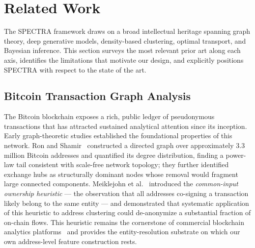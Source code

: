 
\section{Related Work}
\label{sec:related_work}

The SPECTRA framework draws on a broad intellectual heritage spanning graph
theory, deep generative models, density-based clustering, optimal transport,
and Bayesian inference.  This section surveys the most relevant prior art along
each axis, identifies the limitations that motivate our design, and explicitly
positions SPECTRA with respect to the state of the art.

\subsection{Bitcoin Transaction Graph Analysis}
\label{subsec:bitcoin_graph}

The Bitcoin blockchain exposes a rich, public ledger of pseudonymous
transactions that has attracted sustained analytical attention since its
inception.  Early graph-theoretic studies established the foundational
properties of this network.  Ron and Shamir~\cite{Ron2013} constructed a
directed graph over approximately 3.3 million Bitcoin addresses and quantified
its degree distribution, finding a power-law tail consistent with scale-free
network topology; they further identified exchange hubs as structurally
dominant nodes whose removal would fragment large connected components.
Meiklejohn et al.~\cite{Meiklejohn2013} introduced the \emph{common-input
ownership heuristic} --- the observation that all addresses co-signing a
transaction likely belong to the same entity --- and demonstrated that
systematic application of this heuristic to address clustering could de-anonymize
a substantial fraction of on-chain flows.  This heuristic remains the
cornerstone of commercial blockchain analytics platforms~\cite{Chainalysis2023}
and provides the entity-resolution substrate on which our own address-level
feature construction rests.

